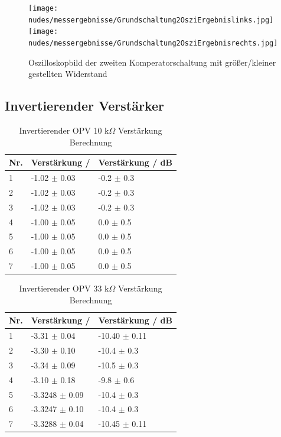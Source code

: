 \documentclass[12pt,a4paper,twoside]{article}
\begin{document}
\begin{figure}[H]
    \centering
    \texttt{[image: nudes/messergebnisse/Grundschaltung2OsziErgebnislinks.jpg]}
    \texttt{[image: nudes/messergebnisse/Grundschaltung2OsziErgebnisrechts.jpg]}
    \caption{Oszilloskopbild der zweiten Komperatorschaltung mit größer/kleiner gestellten Widerstand}
    \label{fig:Grundschaltung2ErgebnissPotiAW}
\end{figure}


\subsection{Invertierender Verstärker}

\begin{table}[H]
    \centering
    \caption{Invertierender OPV 10 k$\Omega$ Verstärkung Berechnung}
    \label{tab:IoVerstärkungenBerechnet10AW}
    \begin{tabular}{| l | l | l |}
        \hline
        Nr. & Verstärkung / & Verstärkung / dB \\
        \hline
        1 & -1.02 $\pm$ 0.03 & -0.2 $\pm$ 0.3 \\
        2 & -1.02 $\pm$ 0.03 & -0.2 $\pm$ 0.3 \\
        3 & -1.02 $\pm$ 0.03 & -0.2 $\pm$ 0.3 \\
        4 & -1.00 $\pm$ 0.05 &  0.0 $\pm$ 0.5 \\
        5 & -1.00 $\pm$ 0.05 &  0.0 $\pm$ 0.5 \\
        6 & -1.00 $\pm$ 0.05 &  0.0 $\pm$ 0.5 \\
        7 & -1.00 $\pm$ 0.05 &  0.0 $\pm$ 0.5 \\
        \hline
    \end{tabular}
\end{table}

\begin{table}[H]
    \centering
    \caption{Invertierender OPV 33 k$\Omega$ Verstärkung Berechnung}
    \label{tab:IoVerstärkungenBerechnet33AW}
    \begin{tabular}{| l | l | l |}
        \hline
        Nr. & Verstärkung / & Verstärkung / dB \\
        \hline
        1 & -3.31 $\pm$ 0.04 & -10.40 $\pm$ 0.11 \\
        2 & -3.30 $\pm$ 0.10 & -10.4 $\pm$ 0.3 \\
        3 & -3.34 $\pm$ 0.09 & -10.5 $\pm$ 0.3 \\
        4 & -3.10 $\pm$ 0.18 & -9.8 $\pm$ 0.6 \\
        5 & -3.3248 $\pm$ 0.09 & -10.4 $\pm$ 0.3 \\
        6 & -3.3247 $\pm$ 0.10 & -10.4 $\pm$ 0.3 \\
        7 & -3.3288 $\pm$ 0.04 & -10.45 $\pm$ 0.11 \\
        \hline
    \end{tabular}
\end{table}
\end{document}
